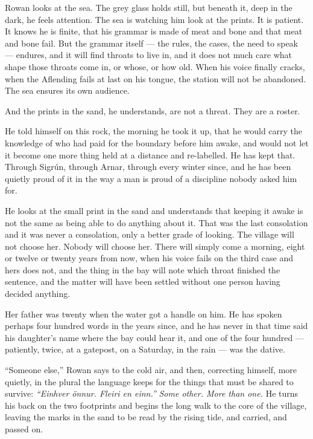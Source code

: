 \documentclass[11pt,oneside]{book}
\begin{document}
Rowan looks at the sea. The grey glass holds still, but beneath it, deep
in the dark, he feels attention. The sea is watching him look at the
prints. It is patient. It knows he is finite, that his grammar is made
of meat and bone and that meat and bone fail. But the grammar itself ---
the rules, the cases, the need to speak --- endures, and it will find
throats to live in, and it does not much care what shape those throats
come in, or whose, or how old. When his voice finally cracks, when the
Aflending fails at last on his tongue, the station will not be
abandoned. The sea ensures its own audience.

And the prints in the sand, he understands, are not a threat. They are a
roster.

He told himself on this rock, the morning he took it up, that he would
carry the knowledge of who had paid for the boundary before him awake,
and would not let it become one more thing held at a distance and
re-labelled. He has kept that. Through Sigrún, through Arnar, through
every winter since, and he has been quietly proud of it in the way a man
is proud of a discipline nobody asked him for.

He looks at the small print in the sand and understands that keeping it
awake is not the same as being able to do anything about it. That was
the last consolation and it was never a consolation, only a better grade
of looking. The village will not choose her. Nobody will choose her.
There will simply come a morning, eight or twelve or twenty years from
now, when his voice fails on the third case and hers does not, and the
thing in the bay will note which throat finished the sentence, and the
matter will have been settled without one person having decided
anything.

Her father was twenty when the water got a handle on him. He has spoken
perhaps four hundred words in the years since, and he has never in that
time said his daughter's name where the bay could hear it, and one of
the four hundred --- patiently, twice, at a gatepost, on a Saturday, in
the rain --- was the dative.

``Someone else,'' Rowan says to the cold air, and then, correcting
himself, more quietly, in the plural the language keeps for the things
that must be shared to survive: \emph{``Einhver önnur. Fleiri en
einn.''} \emph{Some other. More than one.} He turns his back on the two
footprints and begins the long walk to the core of the village, leaving
the marks in the sand to be read by the rising tide, and carried, and
passed on.
\end{document}
